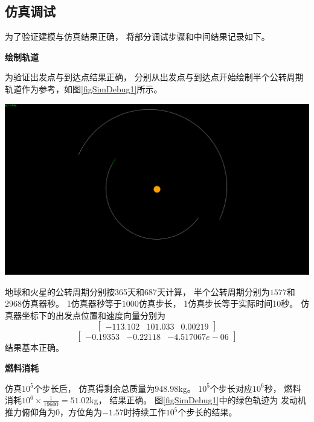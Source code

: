 \subsection{仿真调试}
为了验证建模与仿真结果正确，
将部分调试步骤和中间结果记录如下。

\noindent\textbf{绘制轨道}\par
为验证出发点与到达点结果正确，
分别从出发点与到达点开始绘制半个公转周期轨道作为参考，如图\ref{figSimDebug1}所示。
\begin{center}
	\includegraphics[scale=0.2]{simdebug1.png}  \\
	\label{figSimDebug1}
\end{center}
地球和火星的公转周期分别按365天和687天计算，
半个公转周期分别为$1577$和$2968$仿真器秒。
1仿真器秒等于$1000$仿真步长，
1仿真步长等于实际时间10秒。
仿真器坐标下的出发点位置和速度向量分别为
\[[\begin{matrix}
    -113.102 & 101.033 & 0.00219
\end{matrix}]\]
\[[\begin{matrix}
    -0.19353 & -0.22118 & -4.517067e-06
\end{matrix}]\]
结果基本正确。

\noindent\textbf{燃料消耗}\par
仿真$10^5$个步长后，
仿真得剩余总质量为$948.98$kg。
$10^5$个步长对应$10^6$秒，
燃料消耗$10^6\times\frac{1}{19600}=51.02$kg，
结果正确。
图\ref{figSimDebug1}中的绿色轨迹为
发动机推力俯仰角为0，方位角为$-1.57$时持续工作$10^5$个步长的结果。
